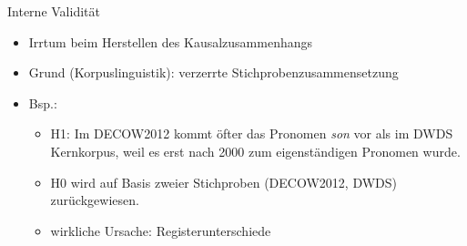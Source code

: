 
\begin{frame}
  {Interne Validität}
  \begin{itemize}[<+->]
    \item Irrtum beim Herstellen des Kausalzusammenhangs
    \item Grund (Korpuslinguistik): verzerrte Stichprobenzusammensetzung
    \item Bsp.:
      \begin{itemize}[<+->]
	\item H1: Im DECOW2012 kommt öfter das Pronomen \textit{son} vor als im DWDS Kernkorpus, weil es erst nach 2000 zum eigenständigen Pronomen wurde.
	\item H0 wird auf Basis zweier Stichproben (DECOW2012, DWDS) zurückgewiesen.
	\item wirkliche Ursache: Registerunterschiede
      \end{itemize}
  \end{itemize}
\end{frame}

